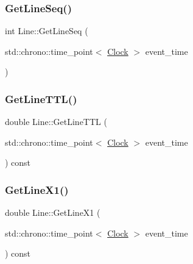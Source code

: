 \mbox{\label{classLine_a8764cb987ec4af839f30411dc47a835a}} 
\subsubsection{\texorpdfstring{Get\+Line\+Seq()}{GetLineSeq()}}
{\footnotesize\ttfamily int Line\+::\+Get\+Line\+Seq (\begin{DoxyParamCaption}\item[{std\+::chrono\+::time\+\_\+point$<$ \mbox{\hyperlink{universe_8h_a0ef8d951d1ca5ab3cfaf7ab4c7a6fd80}{Clock}} $>$}]{event\+\_\+time }\end{DoxyParamCaption})\hspace{0.3cm}{\ttfamily [inline]}}

\mbox{\label{classLine_a5b9419146093908e5c7d740ac384fe39}} 
\subsubsection{\texorpdfstring{Get\+Line\+T\+T\+L()}{GetLineTTL()}}
{\footnotesize\ttfamily double Line\+::\+Get\+Line\+T\+TL (\begin{DoxyParamCaption}\item[{std\+::chrono\+::time\+\_\+point$<$ \mbox{\hyperlink{universe_8h_a0ef8d951d1ca5ab3cfaf7ab4c7a6fd80}{Clock}} $>$}]{event\+\_\+time }\end{DoxyParamCaption}) const\hspace{0.3cm}{\ttfamily [inline]}}

\mbox{\label{classLine_ab14245ec4348e925b6e0f860e9254308}} 
\subsubsection{\texorpdfstring{Get\+Line\+X1()}{GetLineX1()}}
{\footnotesize\ttfamily double Line\+::\+Get\+Line\+X1 (\begin{DoxyParamCaption}\item[{std\+::chrono\+::time\+\_\+point$<$ \mbox{\hyperlink{universe_8h_a0ef8d951d1ca5ab3cfaf7ab4c7a6fd80}{Clock}} $>$}]{event\+\_\+time }\end{DoxyParamCaption}) const\hspace{0.3cm}{\ttfamily [inline]}}

